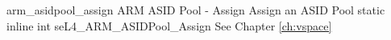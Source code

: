 %
%
%
%

\apidoc
{arm_asidpool_assign}
{ARM ASID Pool - Assign}
{Assign an ASID Pool}
{static inline int seL4\_ARM\_ASIDPool\_Assign}
{
}
{\errorenumdesc}
{See Chapter \ref{ch:vspace}}
